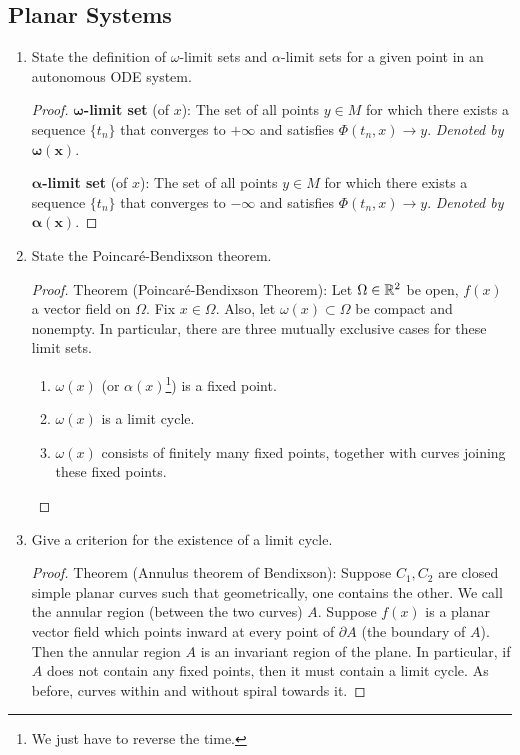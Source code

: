 \documentclass[../psets.tex]{subfiles}
\begin{document}
\subsection*{Planar Systems}
\begin{enumerate}
    \item State the definition of $\omega$-limit sets and $\alpha$-limit sets for a given point in an autonomous ODE system.
    \begin{proof}
        \textbf{$\bm{\omega}$-limit set} (of $x$): The set of all points $y\in M$ for which there exists a sequence $\{t_n\}$ that converges to $+\infty$ and satisfies $\Phi(t_n,x)\to y$. \emph{Denoted by} $\bm{\omega(x)}$.\par
        \textbf{$\bm{\alpha}$-limit set} (of $x$): The set of all points $y\in M$ for which there exists a sequence $\{t_n\}$ that converges to $-\infty$ and satisfies $\Phi(t_n,x)\to y$. \emph{Denoted by} $\bm{\alpha(x)}$.
    \end{proof}
    \item State the Poincar\'{e}-Bendixson theorem.
    \begin{proof}
        Theorem (Poincar\'{e}-Bendixson Theorem): Let $\Omega\in\mathbb{R}^2$ be open, $f(x)$ a vector field on $\Omega$. Fix $x\in\Omega$. Also, let $\omega(x)\subset\Omega$ be compact and nonempty. In particular, there are three mutually exclusive cases for these limit sets.
        \begin{enumerate}
            \item $\omega(x)$ (or $\alpha(x)$\footnote{We just have to reverse the time.}) is a fixed point.
            \item $\omega(x)$ is a limit cycle.
            \item $\omega(x)$ consists of finitely many fixed points, together with curves joining these fixed points.
        \end{enumerate}
    \end{proof}
    \item Give a criterion for the existence of a limit cycle.
    \begin{proof}
        Theorem (Annulus theorem of Bendixson): Suppose $C_1,C_2$ are closed simple planar curves such that geometrically, one contains the other. We call the annular region (between the two curves) $A$. Suppose $f(x)$ is a planar vector field which points inward at every point of $\partial A$ (the boundary of $A$). Then the annular region $A$ is an invariant region of the plane. In particular, if $A$ does not contain any fixed points, then it must contain a limit cycle. As before, curves within and without spiral towards it.

\end{proof}
\end{enumerate}
\end{document}
